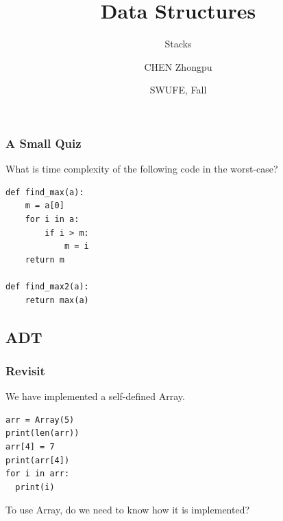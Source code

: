 \documentclass[aspectratio=169, 14pt]{beamer}
\title[Data Structures] %
{Data Structures}
\subtitle{Stacks}
\author[CHEN Zhongpu] %
{CHEN Zhongpu}
\institute[] %
{
	School of Computing and Artificial Intelligence \\
	\href{mailto:zpchen@swufe.edu.cn}{zpchen@swufe.edu.cn}
}
\date[] %
{SWUFE, Fall \the\year{}}
\begin{document}
\frame{\titlepage}

\begin{frame}[fragile]
	\frametitle{A Small Quiz}

	What is time complexity of the following code in the worst-case?
	\begin{verbatim}
def find_max(a):
    m = a[0]
    for i in a:
        if i > m:
            m = i
    return m

def find_max2(a):
    return max(a)
\end{verbatim}

\end{frame}


{
\begin{frame}
	\section{\textcolor{darkmidnightblue}{ADT}}
\end{frame}
}

\begin{frame}[fragile]
	\frametitle{Revisit}
	We have implemented a self-defined \alert{Array}.

	\begin{verbatim}
arr = Array(5)
print(len(arr))
arr[4] = 7
print(arr[4])
for i in arr:
  print(i)
\end{verbatim}

	To use \alert{Array}, do we need to know how it is implemented?
\end{frame}
\end{document}

